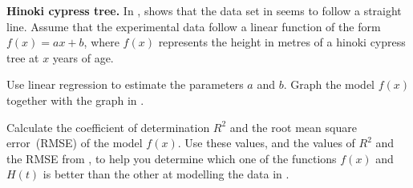 \documentclass[a4paper,oneside,12pt]{article}
\begin{document}
\begin{exercise}
\textbf{Hinoki cypress tree.}
In ,
 shows that the data set
in  seems to follow a straight
line.  Assume that the experimental data follow a linear function of
the form $f(x) = ax + b$, where $f(x)$ represents the height in metres
of a hinoki cypress tree at $x$ years of age.
\begin{packedenum}
\item\label{subex:logarithm:hinoki_linear_regression}
  Use linear regression to estimate the parameters $a$ and $b$.  Graph
  the model $f(x)$ together with the graph in
  .

\item\label{subex:logarithm:hinoki_Pearson_rho_RMS_error}
  Calculate the coefficient of determination $R^2$ and the root mean
  square error~(RMSE) of the model $f(x)$.  Use these values, and the
  values of $R^2$ and the RMSE from
  , to help you determine
  which one of the functions $f(x)$ and $H(t)$ is better than the
  other at modelling the data in
  .
\end{packedenum}
\end{exercise}
\end{document}
